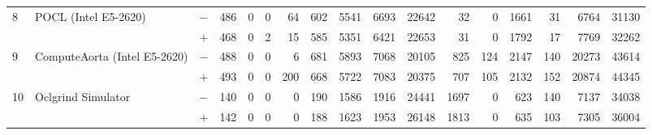 \begin{tabular}{lll | rrrrrrr | rrrrrrr }
\hline
\multirow{ 2}{*}{8} & \multirow{ 2}{*}{POCL (Intel E5-2620)} & $-$ & 486 & 0 & 0 & 64 & 602 & 5541 & 6693       & 22642 & 32 & 0 & 1661 & 31 & 6764 & 31130 \\& & $+$ & 468 & 0 & 2 & 15 & 585 & 5351 & 6421 & 22653 & 31 & 0 & 1792 & 17 & 7769 & 32262 \\
\hline
\multirow{ 2}{*}{9} & \multirow{ 2}{*}{ComputeAorta (Intel E5-2620)} & $-$ & 488 & 0 & 0 & 6 & 681 & 5893 & 7068       & 20105 & 825 & 124 & 2147 & 140 & 20273 & 43614 \\& & $+$ & 493 & 0 & 0 & 200 & 668 & 5722 & 7083 & 20375 & 707 & 105 & 2132 & 152 & 20874 & 44345 \\
\hline
\multirow{ 2}{*}{10} & \multirow{ 2}{*}{Oclgrind Simulator} & $-$ & 140 & 0 & 0 & 0 & 190 & 1586 & 1916       & 24441 & 1697 & 0 & 623 & 140 & 7137 & 34038 \\& & $+$ & 142 & 0 & 0 & 0 & 188 & 1623 & 1953 & 26148 & 1813 & 0 & 635 & 103 & 7305 & 36004 \\
  \bottomrule
\end{tabular}

